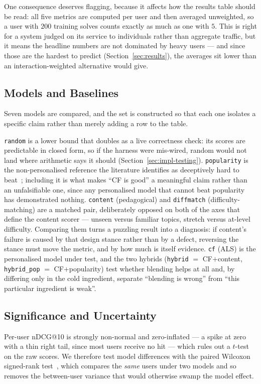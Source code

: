 \documentclass[12pt,a4paper]{article}
\newcommand{\ndcg}{nDCG}
\begin{document}
One consequence deserves flagging, because it affects how the results table should be
read: all five metrics are computed per user and then averaged unweighted, so a user with
$200$ training solves counts exactly as much as one with $5$. This is right for a system judged on its service to individuals rather than aggregate
traffic, but it means the headline numbers are not dominated by heavy users --- and since
those are the hardest to predict (Section~\ref{sec:results}), the averages sit lower than
an interaction-weighted alternative would give.

\subsection{Models and Baselines}
Seven models are compared, and the set is constructed so that each one isolates a
specific claim rather than merely adding a row to the table.

\texttt{random} is a lower bound that doubles as a live correctness check: its scores are
predictable in closed form, so if the harness were mis-wired, random would not land where
arithmetic says it should (Section~\ref{sec:impl-testing}). \texttt{popularity} is the
non-personalised reference the literature identifies as deceptively hard to
beat~\cite{cremonesi2010}; including it is what makes ``CF is good'' a meaningful claim
rather than an unfalsifiable one, since any personalised model that cannot beat
popularity has demonstrated nothing. \texttt{content} (pedagogical) and \texttt{diffmatch}
(difficulty-matching) are a matched pair, deliberately opposed on both of the axes that
define the content scorer --- unseen versus familiar topics, stretch versus at-level
difficulty. Comparing them turns a puzzling result into a diagnosis: if content's failure
is caused by that design stance rather than by a defect, reversing the stance must move
the metric, and by how much is itself evidence. \texttt{cf} (ALS) is the personalised
model under test, and the two hybrids (\texttt{hybrid} $=$ CF$+$content,
\texttt{hybrid\_pop} $=$ CF$+$popularity) test whether blending helps at all and, by
differing only in the cold ingredient, separate ``blending is wrong'' from ``this
particular ingredient is weak''.

\subsection{Significance and Uncertainty}
Per-user \ndcg{}@10 is strongly non-normal and zero-inflated --- a spike at zero with a
thin right tail, since most users receive no hit --- which rules out a $t$-test on the raw
scores. We therefore test model differences with the paired Wilcoxon signed-rank
test~\cite{wilcoxon1945}, which compares the \emph{same} users under two models and so
removes the between-user variance that would otherwise swamp the model effect.
\end{document}
